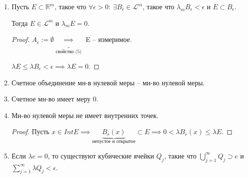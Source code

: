 \begin{properties}
\begin{enumerate}
{            $A_{\epsilon} \subset E \subset B_{\epsilon}$ и $\lambda_m (B_{\epsilon} \setminus A_{\epsilon}) < \epsilon$, тогда $E \in \mathscr{L}^m$
            
            \begin{proof}

                $A := \bigcup_{n=1}^{\infty} A_{\frac{1}{n}} \in \mathscr{L}^m$ и $B := \bigcap_{n=1}^{\infty} B_{\frac{1}{n}} \in \mathscr{L}^m$.

                $A \subset E \subset B$, $B \setminus A \subset B_{\frac{1}{n}} \setminus A_{\frac{1}{n}}$.

                $\lambda_m (B \setminus A) \leq \lambda_m (B_{\frac{1}{n}} \setminus A_{\frac{1}{n}}) < \frac{1}{n} \implies \lambda_m (B \setminus A) = 0$.

                $E \setminus A \subset B \setminus A \implies E \setminus A \in \mathscr{L}^m \implies E = E \setminus A \sqcup A \in \mathscr{L}^m$.
            \end{proof}
        }
        \item {
            Пусть $E \subset \mathbb{R}^m$, такое что $\forall \epsilon > 0: \ \exists B_{\epsilon} \in \mathscr{L}^m$, такое что $\lambda_m B_{\epsilon} < \epsilon$ и $E \subset B_{\epsilon}$.

            Тогда  $E \in \mathscr{L}^m$ и $\lambda_m E = 0$.

            \begin{proof}
                $A_{\epsilon} := \emptyset \underbrace{\implies}_{\text{свойство (5)}}$ E -- измеримое.

                $\lambda E \leq \lambda B_{\epsilon} < \epsilon \implies \lambda E = 0$.
            \end{proof}
        }
        \item {
            Счетное объединение мн-в нулевой меры -- мн-во нулевой меры.
        }
        \item {
            Счетное мн-во имеет меру 0.
        }
        \item {
            Мн-во нулевой меры не имеет внутренних точек.

            \begin{proof}
                Пусть $x \in Int E \implies \underbrace{B_r(x)}_{\text{непустое и открытое}} \subset E \implies 0 < \lambda B_r(x) \leq \lambda E$.
            \end{proof}
        }
        \item {
            Если $\lambda e = 0$, то существуют кубические ячейки $Q_j$, такие что $\bigcup_{j=1}^{\infty}Q_j \supset e$ и $\sum_{j=1}^{\infty} \lambda Q_j < \epsilon$.

}
\end{enumerate}
\end{properties}
